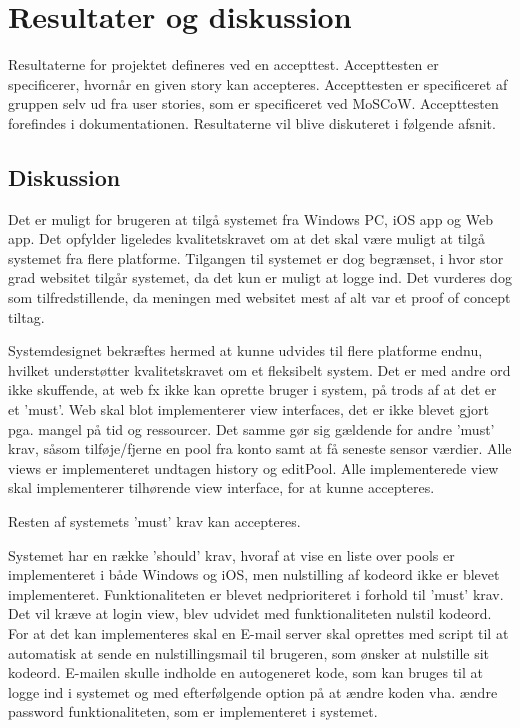 \chapter{Resultater og diskussion}
Resultaterne for projektet defineres ved en accepttest. Accepttesten er specificerer, hvornår en given story kan accepteres. Accepttesten er specificeret af gruppen selv ud fra user stories, som er specificeret ved MoSCoW. Accepttesten forefindes i dokumentationen. Resultaterne vil blive diskuteret i følgende afsnit.

\section{Diskussion}
Det er muligt for brugeren at tilgå systemet fra Windows PC, iOS app og Web app. Det opfylder ligeledes kvalitetskravet om at det skal være muligt at tilgå systemet fra flere platforme. Tilgangen til systemet er dog begrænset, i hvor stor grad websitet tilgår systemet, da det kun er muligt at logge ind. Det vurderes dog som tilfredstillende, da meningen med websitet mest af alt var et proof of concept tiltag. 

Systemdesignet bekræftes hermed at kunne udvides til flere platforme endnu, hvilket understøtter kvalitetskravet om et fleksibelt system. Det er med andre ord ikke skuffende, at web fx ikke kan oprette bruger i system, på trods af at det er et 'must'. Web skal blot implementerer view interfaces, det er ikke blevet gjort pga. mangel på tid og ressourcer. Det samme gør sig gældende for andre 'must' krav, såsom tilføje/fjerne en pool fra konto samt at få seneste sensor værdier. Alle views er implementeret undtagen history og editPool. Alle implementerede view skal implementerer tilhørende view interface, for at kunne accepteres. 

Resten af systemets 'must' krav kan accepteres.

Systemet har en række 'should' krav, hvoraf at vise en liste over pools er implementeret i både Windows og iOS, men nulstilling af kodeord ikke er blevet implementeret. Funktionaliteten er blevet nedprioriteret i forhold til 'must' krav. Det vil kræve at login view, blev udvidet med funktionaliteten nulstil kodeord. For at det kan implementeres skal en E-mail server skal oprettes med script til at automatisk at sende en nulstillingsmail til brugeren, som ønsker at nulstille sit kodeord. E-mailen skulle indholde en autogeneret kode, som kan bruges til at logge ind i systemet og med efterfølgende option på at ændre koden vha. ændre password funktionaliteten, som er implementeret i systemet.

